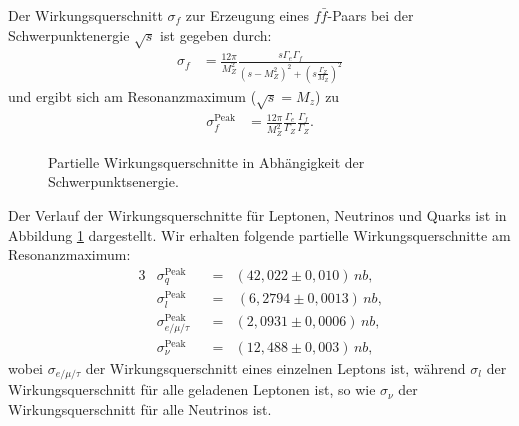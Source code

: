 Der Wirkungsquerschnitt $\sigma_f$ zur Erzeugung eines $f\bar{f}$-Paars bei der Schwerpunktenergie $\sqrt{s}$ ist gegeben durch:
\begin{align}
	\sigma_f&=\frac{12\pi}{M_Z^2}\frac{s\Gamma_e\Gamma_f}{\left(s-M_Z^2\right)^2+\left(s\frac{\Gamma_Z}{M_Z}\right)^2}
\end{align}
und ergibt sich am Resonanzmaximum ($\sqrt{s}=M_z$) zu
\begin{align}
	\sigma_f^\text{Peak}&=\frac{12\pi}{M_Z^2}\frac{\Gamma_e}{\Gamma_Z}\frac{\Gamma_f}{\Gamma_Z}\text{.}
\end{align}

\begin{figure}
	\centering
	\caption[Partielle Wirkungsquerschnitte in Abhängigkeit der Schwerpunktsenergie]{Partielle Wirkungsquerschnitte in Abhängigkeit der Schwerpunktsenergie.}
	\label{fig:partialbreiten}
\end{figure}

Der Verlauf der Wirkungsquerschnitte für Leptonen, Neutrinos und Quarks ist in Abbildung \ref{fig:partialbreiten} dargestellt. Wir erhalten folgende partielle Wirkungsquerschnitte am Resonanzmaximum:
\begin{alignat}{3}
	&\sigma_q^\text{Peak}&&=&(42,022\pm0,010)\,\si{nb}\text{,}\\
	&\sigma_l^\text{Peak}&&=&\,(6,2794\pm0,0013)\,\si{nb}\text{,}\\
	&\sigma_{e/\mu/\tau}^\text{Peak}&&=&(2,0931\pm0,0006)\,\si{nb}\text{,}\\
	&\sigma_\nu^\text{Peak}&&=&(12,488\pm0,003)\,\si{nb}\text{,}
\end{alignat}
wobei $\sigma_{e/\mu/\tau}$ der Wirkungsquerschnitt eines einzelnen Leptons ist, während $\sigma_{l}$ der Wirkungsquerschnitt für alle geladenen Leptonen ist, so wie $\sigma_\nu$ der Wirkungsquerschnitt für alle Neutrinos ist.


